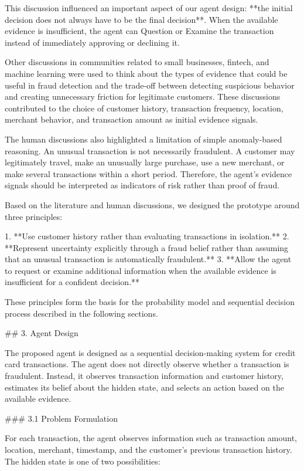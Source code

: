 This discussion influenced an important aspect of our agent design: **the initial decision does not always have to be the final decision**. When the available evidence is insufficient, the agent can Question or Examine the transaction instead of immediately approving or declining it.

Other discussions in communities related to small businesses, fintech, and machine learning were used to think about the types of evidence that could be useful in fraud detection and the trade-off between detecting suspicious behavior and creating unnecessary friction for legitimate customers. These discussions contributed to the choice of customer history, transaction frequency, location, merchant behavior, and transaction amount as initial evidence signals.

The human discussions also highlighted a limitation of simple anomaly-based reasoning. An unusual transaction is not necessarily fraudulent. A customer may legitimately travel, make an unusually large purchase, use a new merchant, or make several transactions within a short period. Therefore, the agent's evidence signals should be interpreted as indicators of risk rather than proof of fraud.

Based on the literature and human discussions, we designed the prototype around three principles:

1. **Use customer history rather than evaluating transactions in isolation.**
2. **Represent uncertainty explicitly through a fraud belief rather than assuming that an unusual transaction is automatically fraudulent.**
3. **Allow the agent to request or examine additional information when the available evidence is insufficient for a confident decision.**

These principles form the basis for the probability model and sequential decision process described in the following sections.

## 3. Agent Design

The proposed agent is designed as a sequential decision-making system for credit card transactions. The agent does not directly observe whether a transaction is fraudulent. Instead, it observes transaction information and customer history, estimates its belief about the hidden state, and selects an action based on the available evidence.

### 3.1 Problem Formulation

For each transaction, the agent observes information such as transaction amount, location, merchant, timestamp, and the customer's previous transaction history. The hidden state is one of two possibilities:

